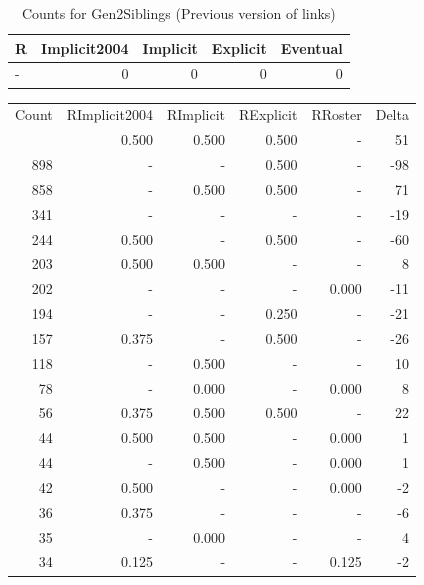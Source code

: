 \documentclass[a4paper]{article}\usepackage{graphicx, color}
\begin{document}
\begin{table}[ht]
\centering
{\large
\begin{tabular}{lrrrr}
  \hline
R & Implicit2004 & Implicit & Explicit & Eventual \\ 
  \hline
- &   0 &   0 &   0 &   0 \\ 
   \hline
\end{tabular}
}
\caption{Counts for Gen2Siblings (Previous version of links)} 
\end{table}



\begin{table}[ht]
\centering
\begin{tabular}{rrrrrr}
  \hline
Count & RImplicit2004 & RImplicit & RExplicit & RRoster & Delta \\ 
  \rowcolor{goodColor}  \hline
1243 & 0.500 & 0.500 & 0.500 & - & 51 \\ 
   \rowcolor{sosoColor} 898 & - & - & 0.500 & - & -98 \\ 
   \rowcolor{goodColor} 858 & - & 0.500 & 0.500 & - & 71 \\ 
   \rowcolor{nullColor} 341 & - & - & - & - & -19 \\ 
   \rowcolor{sosoColor} 244 & 0.500 & - & 0.500 & - & -60 \\ 
  203 & 0.500 & 0.500 & - & - & 8 \\ 
   \rowcolor{nullColor} 202 & - & - & - & 0.000 & -11 \\ 
   \rowcolor{sosoColor} 194 & - & - & 0.250 & - & -21 \\ 
   \rowcolor{sosoColor} 157 & 0.375 & - & 0.500 & - & -26 \\ 
  118 & - & 0.500 & - & - & 10 \\ 
  78 & - & 0.000 & - & 0.000 & 8 \\ 
   \rowcolor{goodColor} 56 & 0.375 & 0.500 & 0.500 & - & 22 \\ 
  44 & 0.500 & 0.500 & - & 0.000 & 1 \\ 
  44 & - & 0.500 & - & 0.000 & 1 \\ 
   \rowcolor{nullColor} 42 & 0.500 & - & - & 0.000 & -2 \\ 
   \rowcolor{nullColor} 36 & 0.375 & - & - & - & -6 \\ 
  35 & - & 0.000 & - & - & 4 \\ 
   \rowcolor{nullColor} 34 & 0.125 & - & - & 0.125 & -2 \\ 

\end{tabular}
\end{table}
\end{document}

